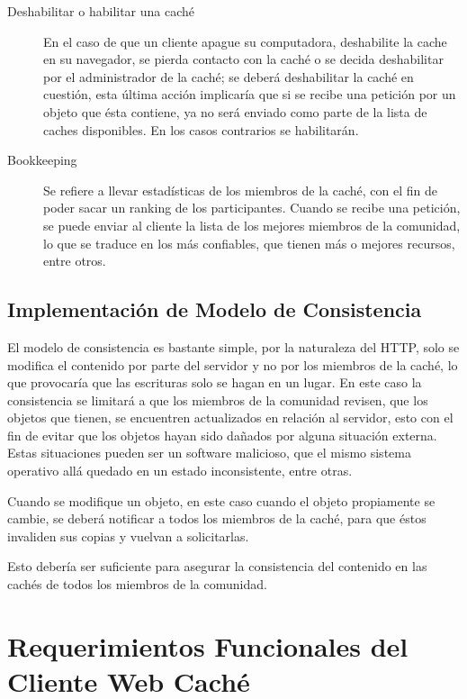 \begin{description}
\item[Deshabilitar o habilitar una caché] En el caso de que un cliente apague su computadora, deshabilite la cache en su navegador, se pierda contacto con la caché o se decida deshabilitar por el administrador de la caché; se deberá deshabilitar la caché en cuestión, esta última acción implicaría que si se recibe una petición por un objeto que ésta contiene, ya no será enviado como parte de la lista de caches disponibles. En los casos contrarios se habilitarán.

\item [Bookkeeping] Se refiere a llevar estadísticas de los miembros de la caché, con el fin de poder sacar un ranking de los participantes. Cuando se recibe una petición, se puede enviar al cliente la lista de los mejores miembros de la comunidad, lo que se traduce en los más confiables, que tienen más o mejores recursos, entre otros.

\end{description}


\subsection{Implementación de Modelo de Consistencia}
El modelo de consistencia es bastante simple, por la naturaleza del HTTP, solo se modifica el contenido por parte del servidor y no por los miembros de la caché, lo que provocaría que las escrituras solo se hagan en un lugar. En este caso la consistencia se limitará a que los miembros de la comunidad revisen, que los objetos que tienen, se encuentren actualizados en relación al servidor, esto con el fin de evitar que los objetos hayan sido dañados por alguna situación externa. Estas situaciones pueden ser un software malicioso, que el mismo sistema operativo allá quedado en un estado inconsistente, entre otras.

Cuando se modifique un objeto, en este caso cuando el objeto propiamente se cambie, se deberá notificar a todos los miembros de la caché, para que éstos invaliden sus copias y vuelvan a solicitarlas. 

Esto debería ser suficiente para asegurar la consistencia del contenido en las cachés de todos los miembros de la comunidad. 


\section{Requerimientos Funcionales del Cliente Web Caché}


